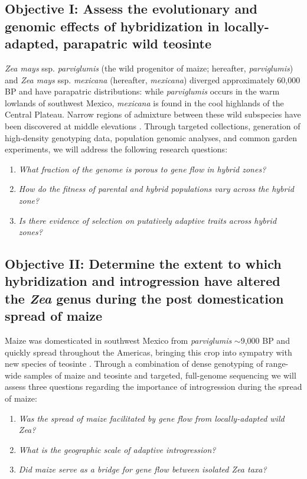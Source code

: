 \subsection*{Objective I: Assess the evolutionary and genomic effects of hybridization in locally-adapted, parapatric wild teosinte}
\emph{Zea mays} ssp. \emph{parviglumis} (the wild progenitor of maize; hereafter, \emph{parviglumis}) and \emph{Zea mays} ssp. \emph{mexicana} (hereafter, \emph{mexicana}) diverged approximately 60,000 BP \citep{Ross-Ibarra2009a} and have parapatric distributions: while \emph{parviglumis} occurs in the warm lowlands of southwest Mexico, \emph{mexicana} is found in the cool highlands of the Central Plateau. Narrow regions of admixture between these wild subspecies have been discovered at middle elevations \citep{Fukunaga2005, Pyhajarvi2013}. 
Through targeted collections, generation of high-density genotyping data, population genomic analyses, and common garden experiments, we will address the following research questions:
\begin{enumerate}
\item \emph{What fraction of the genome is porous to gene flow in hybrid zones?}

\item \emph{How do the fitness of parental and hybrid populations vary across the hybrid zone?}

\item \emph{Is there evidence of selection on putatively adaptive traits across hybrid zones?}
\end{enumerate}
\vspace{0.5cm}

\subsection*{Objective II: Determine the extent to which hybridization and introgression have altered the \emph{Zea} genus during the post domestication spread of maize}
Maize was domesticated in southwest Mexico from \emph{parviglumis} $\sim$9,000 BP \citep{Matsuoka2002} and quickly spread throughout the Americas, bringing this crop into sympatry with new species of teosinte \citep{Vigouroux2008a}. Through a combination of dense genotyping of range-wide samples of maize and teosinte and targeted, full-genome sequencing we will assess three questions regarding the importance of introgression during the spread of maize:
\begin{enumerate}
\item \emph{Was the spread of maize facilitated by gene flow from locally-adapted wild \emph{Zea}?}
\item \emph{What is the geographic scale of adaptive introgression?}
\item \emph{Did maize serve as a bridge for gene flow between isolated \emph{Zea} taxa?}
\end{enumerate}

